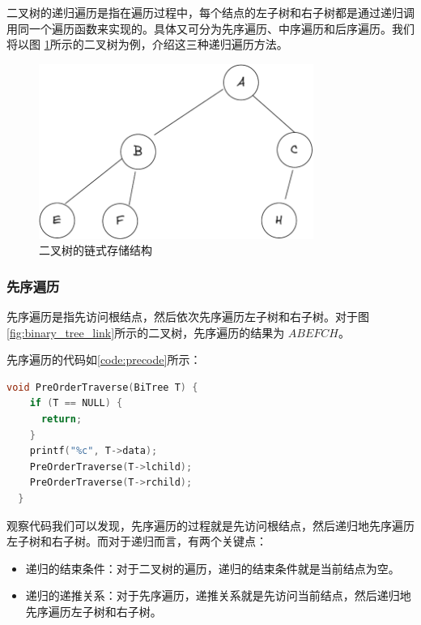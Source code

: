\documentclass[lang=cn,newtx,10pt,scheme=chinese]{../elegantbook}
\begin{document}
二叉树的递归遍历是指在遍历过程中，每个结点的左子树和右子树都是通过递归调用同一个遍历函数来实现的。具体又可分为先序遍历、中序遍历和后序遍历。我们将以图
\ref{fig:one_binary_tree_link}所示的二叉树为例，介绍这三种递归遍历方法。

\begin{figure}
  \centering
  \includegraphics[width=0.8\textwidth]{./figure/pdf/cropped/oneBTree.pdf}
  \caption{二叉树的链式存储结构}
  \label{fig:one_binary_tree_link}
\end{figure}

\subsubsection{先序遍历}

先序遍历是指先访问根结点，然后依次先序遍历左子树和右子树。对于图\ref{fig:binary_tree_link}所示的二叉树，先序遍历的结果为 $ABEFCH$。

先序遍历的代码如\ref{code:precode}所示：

\begin{lstlisting}[language=C++, caption={先序遍历}, label={code:precode}]
  void PreOrderTraverse(BiTree T) {
    if (T == NULL) {
      return;
    }
    printf("%c", T->data);
    PreOrderTraverse(T->lchild);
    PreOrderTraverse(T->rchild);
  }
\end{lstlisting}

观察代码我们可以发现，先序遍历的过程就是先访问根结点，然后递归地先序遍历左子树和右子树。而对于递归而言，有两个关键点：

\begin{itemize}
  \item 递归的结束条件：对于二叉树的遍历，递归的结束条件就是当前结点为空。
  \item 递归的递推关系：对于先序遍历，递推关系就是先访问当前结点，然后递归地先序遍历左子树和右子树。
  \end{itemize}
\end{document}
